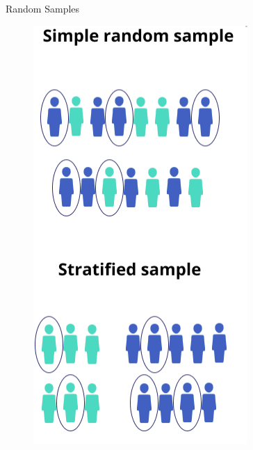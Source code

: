 \documentclass[handout]{beamer}
\begin{document}
\begin{frame}{Random Samples}
\scriptsize{

\begin{figure}[h!]
	\centering
	\includegraphics[scale=0.4]{pics/sample_strat.png}
\end{figure}


} 
\end{frame}
\end{document}
